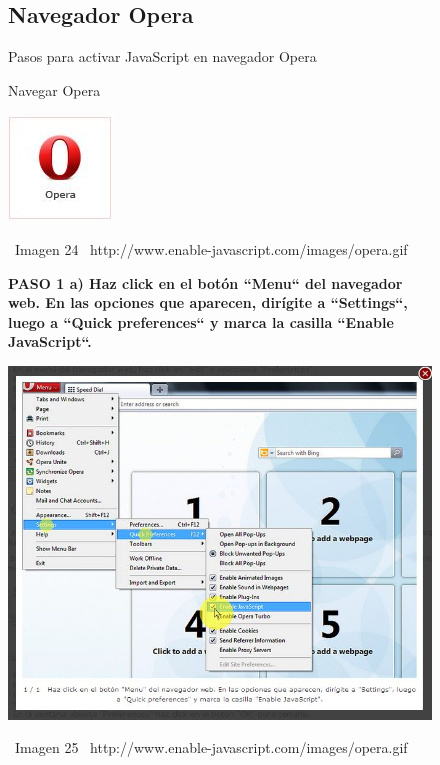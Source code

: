 \documentclass[11pt]{article} %
\begin{document}
\begin{figure}
\subsection{Navegador Opera}
Pasos para activar JavaScript en navegador Opera
\begin{center}
\begin{center}
Navegar Opera

\end{center}
\begin{center}
\includegraphics[height=3 cm, width=3 cm] {imagenes/opera.jpg}
\end{center}

\ Imagen 24
\ {http://www.enable-javascript.com/images/opera.gif}
\newline

\begin{center}
\bf PASO 1
a) Haz click en el botón ``Menu`` del navegador web. En las opciones que aparecen, dirígite a ``Settings``, luego a ``Quick preferences`` y marca la casilla ``Enable JavaScript``.

\includegraphics[height=8 cm, width=8 cm] {imagenes/opera 01.jpg}
\end{center}
\ Imagen 25
\ {http://www.enable-javascript.com/images/opera.gif}

\end{center}
\end{figure}
\end{document}
